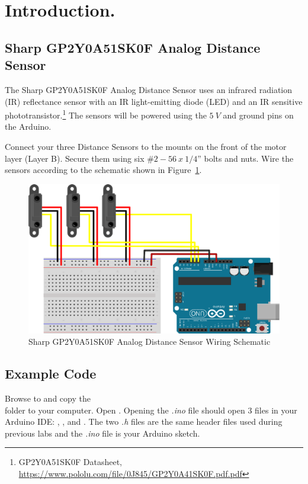 \documentclass{handout}
\begin{document}
	\newpage
	\clearpage
	\pagebreak
	
	\section{Introduction.}
	
	\subsection{Sharp GP2Y0A51SK0F Analog Distance Sensor}
	The Sharp GP2Y0A51SK0F Analog Distance Sensor uses an infrared radiation (IR) reflectance sensor with an IR light-emitting diode (LED) and an IR sensitive phototransistor.\footnote{GP2Y0A51SK0F Datasheet, \url{https://www.pololu.com/file/0J845/GP2Y0A41SK0F.pdf.pdf}} The sensors will be powered using the $5\ V$ and ground pins on the Arduino. 
	
	Connect your three Distance Sensors to the mounts on the front of the motor layer (Layer B). Secure them using six $\#2-56\ x\ 1/4”$ bolts and nuts. Wire the sensors according to the schematic shown in Figure~\ref{Fig IR}.
	
	\begin{figure} [H]
		\centering
		\includegraphics[width=.75\textwidth]{ir.eps}
		\caption{Sharp GP2Y0A51SK0F Analog Distance Sensor Wiring Schematic}
		\label{Fig IR}
	\end{figure}
	
	\subsection{Example Code}
	Browse to  and copy the \\  folder to your computer. Open . Opening the \textit{.ino} file should open 3 files in your Arduino IDE: , , and . The two \textit{.h} files are the same header files used during previous labs and the \textit{.ino} file is your Arduino sketch.
	
\end{document}
